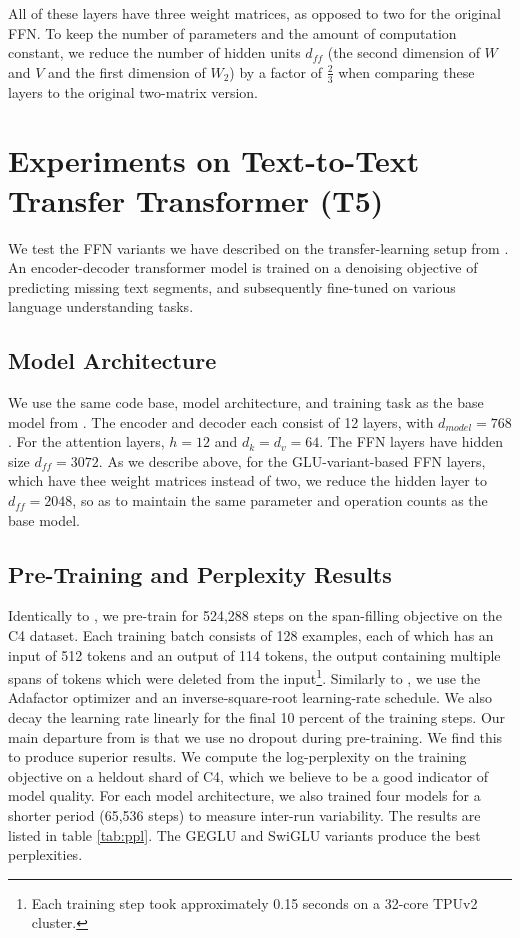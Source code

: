 All of these layers have three weight matrices, as opposed to two for the original FFN.  To keep the number of parameters and the amount of computation constant, we reduce the number of hidden units $d_{ff}$ (the second dimension of $W$ and $V$ and the first dimension of $W_2$) by a factor of $\frac{2}{3}$ when comparing these layers to the original two-matrix version.

\section{Experiments on Text-to-Text Transfer Transformer (T5)}

We test the FFN variants we have described on the transfer-learning setup from \citep{raffel2019exploring}.  An encoder-decoder transformer model \citep{Vas17} is trained on a denoising objective of predicting missing text segments, and subsequently fine-tuned on various language understanding tasks.  

\subsection{Model Architecture}

We use the same code base, model architecture, and training task as the base model from \citep{raffel2019exploring}.  The encoder and decoder each consist of 12 layers, with $d_{model}=768$.  For the attention layers,  $h=12$ and $d_k = d_v = 64$.   The FFN layers have hidden size $d_{ff}=3072$.  As we describe above, for the GLU-variant-based FFN layers, which have thee weight matrices instead of two, we reduce the hidden layer to $d_{ff}=2048$, so as to maintain the same parameter and operation counts as the base model.

\subsection{Pre-Training and Perplexity Results} Identically to \citep{raffel2019exploring}, we pre-train for 524,288 steps on the span-filling objective on the C4 dataset.  Each training batch consists of 128 examples, each of which has an input of 512 tokens and an output of 114 tokens, the output containing multiple spans of tokens which were deleted from the input\footnote{Each training step took approximately 0.15 seconds on a 32-core TPUv2 cluster.}.  Similarly to \citep{raffel2019exploring}, we use the Adafactor optimizer \citep{shazeer2018adafactor} and an inverse-square-root learning-rate schedule.  We also decay the learning rate linearly for the final 10 percent of the training steps.   Our main departure from \citep{raffel2019exploring} is that we use no dropout during pre-training.  We find this to produce superior results. We compute the log-perplexity on the training objective on a heldout shard of C4, which we believe to be a good indicator of model quality.  For each model architecture, we also trained four models for a shorter period (65,536 steps) to measure inter-run variability.  The results are listed in table \ref{tab:ppl}.  The GEGLU and SwiGLU variants produce the best perplexities.

